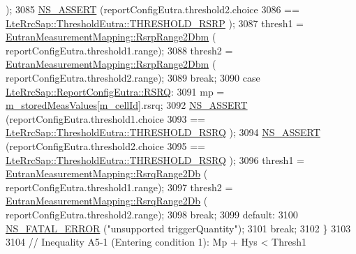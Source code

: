 \begin{DoxyCode}
      );
3085             \hyperlink{assert_8h_a6dccdb0de9b252f60088ce281c49d052}{NS\_ASSERT} (reportConfigEutra.threshold2.choice
3086                        == \hyperlink{structns3_1_1LteRrcSap_1_1ThresholdEutra_ad3ed2704b836132980dd2e97cb03822ca0663d5baa9382bd755acb712f6ebf707}{LteRrcSap::ThresholdEutra::THRESHOLD\_RSRP}
      );
3087             thresh1 = \hyperlink{classns3_1_1EutranMeasurementMapping_a695a24d417b914a41b05a450cc1e1f9e}{EutranMeasurementMapping::RsrpRange2Dbm} (
      reportConfigEutra.threshold1.range);
3088             thresh2 = \hyperlink{classns3_1_1EutranMeasurementMapping_a695a24d417b914a41b05a450cc1e1f9e}{EutranMeasurementMapping::RsrpRange2Dbm} (
      reportConfigEutra.threshold2.range);
3089             \textcolor{keywordflow}{break};
3090           \textcolor{keywordflow}{case} \hyperlink{structns3_1_1LteRrcSap_1_1ReportConfigEutra_a82343ddf526faba0483431ea5882a3efaa4e09cb3c7154d7ab732115a2647325f}{LteRrcSap::ReportConfigEutra::RSRQ}:
3091             mp = \hyperlink{classns3_1_1LteUeRrc_a93094dcd5c235b2e2a8a299125100a57}{m\_storedMeasValues}[\hyperlink{classns3_1_1LteUeRrc_aa9d3317734eea9158371d9fccf3a0c48}{m\_cellId}].rsrq;
3092             \hyperlink{assert_8h_a6dccdb0de9b252f60088ce281c49d052}{NS\_ASSERT} (reportConfigEutra.threshold1.choice
3093                        == \hyperlink{structns3_1_1LteRrcSap_1_1ThresholdEutra_ad3ed2704b836132980dd2e97cb03822ca6e8bda2b99825f09f53388c29b6402b4}{LteRrcSap::ThresholdEutra::THRESHOLD\_RSRQ}
      );
3094             \hyperlink{assert_8h_a6dccdb0de9b252f60088ce281c49d052}{NS\_ASSERT} (reportConfigEutra.threshold2.choice
3095                        == \hyperlink{structns3_1_1LteRrcSap_1_1ThresholdEutra_ad3ed2704b836132980dd2e97cb03822ca6e8bda2b99825f09f53388c29b6402b4}{LteRrcSap::ThresholdEutra::THRESHOLD\_RSRQ}
      );
3096             thresh1 = \hyperlink{classns3_1_1EutranMeasurementMapping_a8c1e02fbc1226718eb0914cf13362147}{EutranMeasurementMapping::RsrqRange2Db} (
      reportConfigEutra.threshold1.range);
3097             thresh2 = \hyperlink{classns3_1_1EutranMeasurementMapping_a8c1e02fbc1226718eb0914cf13362147}{EutranMeasurementMapping::RsrqRange2Db} (
      reportConfigEutra.threshold2.range);
3098             \textcolor{keywordflow}{break};
3099           \textcolor{keywordflow}{default}:
3100             \hyperlink{group__fatal_ga5131d5e3f75d7d4cbfd706ac456fdc85}{NS\_FATAL\_ERROR} (\textcolor{stringliteral}{"unsupported triggerQuantity"});
3101             \textcolor{keywordflow}{break};
3102           \}
3103 
3104         \textcolor{comment}{// Inequality A5-1 (Entering condition 1): Mp + Hys < Thresh1}

\end{DoxyCode}
